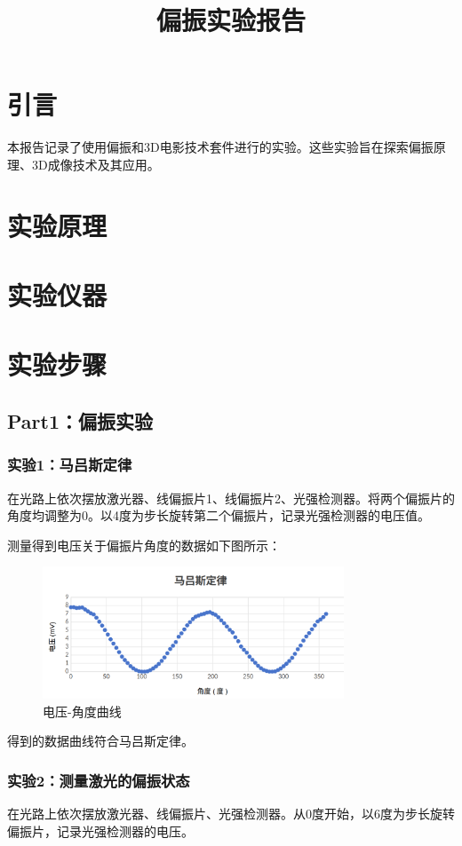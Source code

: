 \documentclass{ctexart}
\title{偏振实验报告}
\begin{document}
\maketitle

\section{引言}
本报告记录了使用偏振和3D电影技术套件进行的实验。这些实验旨在探索偏振原理、3D成像技术及其应用。
\section{实验原理}
\section{实验仪器}
\section{实验步骤}
\subsection{Part1：偏振实验}

\subsubsection{实验1：马吕斯定律}
在光路上依次摆放激光器、线偏振片1、线偏振片2、光强检测器。将两个偏振片的角度均调整为0。以4度为步长旋转第二个偏振片，记录光强检测器的电压值。

测量得到电压关于偏振片角度的数据如下图所示：
\begin{figure}[H]
    \centering
    \includegraphics[width=0.8\textwidth]{实验一.png}
    \caption{电压-角度曲线}
\end{figure}

得到的数据曲线符合马吕斯定律。

\subsubsection{实验2：测量激光的偏振状态}
在光路上依次摆放激光器、线偏振片、光强检测器。从0度开始，以6度为步长旋转偏振片，记录光强检测器的电压。
\end{document}
